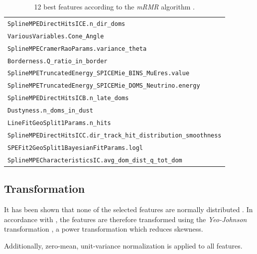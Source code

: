 \begin{table}
    \centering
    \caption{
      12 best features according to the \emph{mRMR} algorithm \cite{dsea_jan}.
    }
    \label{tab:features_best}
    \begin{tabular}{l}
        \toprule
        \texttt{SplineMPEDirectHitsICE.n\_dir\_doms} \\
        \texttt{VariousVariables.Cone\_Angle} \\
        \texttt{SplineMPECramerRaoParams.variance\_theta} \\
        \texttt{Borderness.Q\_ratio\_in\_border} \\
        \texttt{SplineMPETruncatedEnergy\_SPICEMie\_BINS\_MuEres.value} \\
        \texttt{SplineMPETruncatedEnergy\_SPICEMie\_DOMS\_Neutrino.energy} \\
        \texttt{SplineMPEDirectHitsICB.n\_late\_doms} \\
        \texttt{Dustyness.n\_doms\_in\_dust} \\
        \texttt{LineFitGeoSplit1Params.n\_hits} \\
        \texttt{SplineMPEDirectHitsICC.dir\_track\_hit\_distribution\_smoothness} \\
        \texttt{SPEFit2GeoSplit1BayesianFitParams.logl} \\
        \texttt{SplineMPECharacteristicsIC.avg\_dom\_dist\_q\_tot\_dom} \\
        \bottomrule
    \end{tabular}
\end{table}


\subsection{Transformation}
It has been shown that none of the selected features are normally distributed \cite{dsea_jan}.
In accordance with \cite{dsea_jan},
the features are therefore transformed using the \emph{Yeo-Johnson} transformation \cite{yeo_johnson},
a power transformation which reduces skewness.

Additionally, zero-mean, unit-variance normalization is applied to all features.


